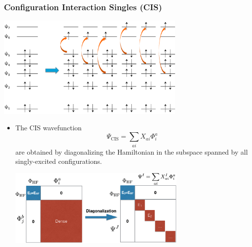\documentclass{beamer} %
\begin{document}
\begin{frame}
\frametitle{Configuration Interaction Singles (CIS) }
\begin{center}
\includegraphics[height=2.0in]{figures/cis.png}
\end{center}
\end{frame}


\begin{frame}
\begin{itemize}
\item The CIS wavefunction 
\begin{equation*}
\Psi_{\textrm{CIS}} = \sum_{ai} X_{ai} \Phi_i^a 
\end{equation*}
are obtained by diagonalizing the Hamiltonian in the subspace spanned by all singly-excited configurations. 
\begin{center}
\includegraphics[height=1.5in]{figures/cis-2.png}
\end{center}
\end{itemize}
\end{frame}
\end{document}

